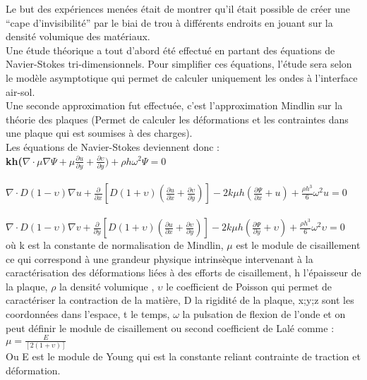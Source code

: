 \documentclass[12pt,a4paper]{article}
\begin{document}
	Le but des expériences menées était de montrer qu’il était possible de créer une “cape d’invisibilité” par le biai de trou à différents endroits en jouant sur la densité volumique des matériaux. \\

	Une étude théorique a tout d’abord été effectué en partant des équations de Navier-Stokes tri-dimensionnels. Pour simplifier ces équations, l’étude sera selon le modèle asymptotique qui permet de calculer uniquement les ondes à l’interface air-sol. \\

	Une seconde approximation fut effectuée, c’est l’approximation Mindlin sur la théorie des plaques (Permet de calculer les déformations et les contraintes dans une plaque qui est soumises à des charges). \\ 

	Les équations de Navier-Stokes deviennent donc : \\

\large \hspace{3cm} \textbf{kh($\nabla\cdot\mu\nabla\Psi+ \mu \frac{\partial u}{\partial y}+ \frac{\partial \upsilon}{\partial y}) + \rho h\omega^{2}\Psi=0 $}\normalsize\\\\
\large \hspace{3cm} \textbf{$\nabla\cdot D(1-\upsilon)\nabla u+\frac{\partial}{\partial x}[D(1+\upsilon)(\frac{\partial u}{\partial x}+\frac{\partial \upsilon}{\partial y})]-2k\mu h(\frac{\partial\Psi}{\partial x}+u)+\frac{\rho h^{3}}{6}\omega^{2}u=0$}\normalsize\\\\
\large \hspace{3cm} \textbf{$\nabla\cdot D(1-\upsilon)\nabla v+\frac{\partial}{\partial y}[D(1+\upsilon)(\frac{\partial u}{\partial x}+\frac{\partial \upsilon}{\partial y})]-2k\mu h(\frac{\partial\Psi}{\partial y}+\upsilon)+\frac{\rho h^{3}}{6}\omega^{2}\upsilon=0$}\normalsize\\

	où k est la constante de normalisation de Mindlin, $\mu$ est le module de cisaillement ce qui correspond à une grandeur physique intrinsèque intervenant à la caractérisation des déformations liées à des efforts de cisaillement, h l’épaisseur de la plaque, $\rho$ la densité volumique , $\upsilon$ le coefficient de Poisson qui permet de caractériser la contraction de la matière, D la rigidité de la plaque, x;y;z sont les coordonnées dans l’espace, t le temps, $\omega$ la pulsation de flexion de l’onde et on peut définir le module de cisaillement ou second coefficient de Lalé comme : \hspace{2cm} \large \textbf{$\mu =\frac{E}{[2(1+\upsilon)]}$}\normalsize \\
	Ou E est le module de Young qui est la constante reliant contrainte de traction et déformation.\\
	
\end{document}
